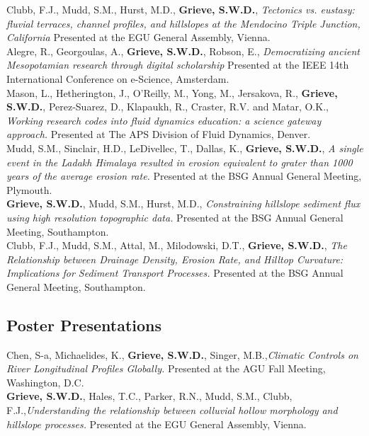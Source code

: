 \documentclass[10pt, a4paper]{article}
\newcommand{\years}[1]{\marginnote{\scriptsize #1}}
\begin{document}
\years{2018}Clubb, F.J., Mudd, S.M., Hurst, M.D., \textbf{Grieve, S.W.D.}, \textit{Tectonics vs. eustasy: fluvial terraces, channel profiles, and hillslopes at the Mendocino Triple Junction, California} Presented at the EGU General Assembly, Vienna.\\[0.05cm]

\years{2018} Alegre, R., Georgoulas, A., \textbf{Grieve, S.W.D.}, Robson, E., \textit{Democratizing ancient Mesopotamian research through digital scholarship} Presented at the IEEE 14th International Conference on e-Science, Amsterdam.\\[0.75cm]

\years{2017}Mason, L., Hetherington, J., O'Reilly, M., Yong, M., Jersakova, R., \textbf{Grieve, S.W.D.}, Perez-Suarez, D., Klapaukh, R., Craster, R.V. and Matar, O.K., \textit{Working research codes into fluid dynamics education: a science gateway approach.} Presented at The APS Division of Fluid Dynamics, Denver.\\[0.05cm]

\years{2016}Mudd, S.M., Sinclair, H.D., LeDivellec, T., Dallas, K., \textbf{Grieve, S.W.D.}, \textit{A single event in the Ladakh Himalaya resulted in erosion equivalent to grater than 1000 years of the average erosion rate.} Presented at the BSG Annual General Meeting, Plymouth.\\[0.05cm]

\years{2015}\textbf{Grieve, S.W.D.}, Mudd, S.M., Hurst, M.D., \textit{Constraining hillslope sediment flux using high resolution topographic data.} Presented at the BSG Annual General Meeting, Southampton.\\[0.05cm]

\years{2015}Clubb, F.J., Mudd, S.M., Attal, M., Milodowski, D.T., \textbf{Grieve, S.W.D.}, \textit{The Relationship between Drainage Density, Erosion Rate, and Hilltop Curvature: Implications for Sediment Transport Processes.} Presented at the BSG Annual General Meeting, Southampton.

\subsection*{Poster Presentations}

\years{2018}Chen, S-a, Michaelides, K., \textbf{Grieve, S.W.D.}, Singer, M.B.,\textit{Climatic Controls on River Longitudinal Profiles Globally.} Presented at the AGU Fall Meeting, Washington, D.C.\\[0.05cm]

\years{2018}\textbf{Grieve, S.W.D.}, Hales, T.C., Parker, R.N., Mudd, S.M., Clubb, F.J.,\textit{Understanding the relationship between colluvial hollow morphology and hillslope processes.} Presented at the EGU General Assembly, Vienna.\\[0.05cm]
\end{document}
